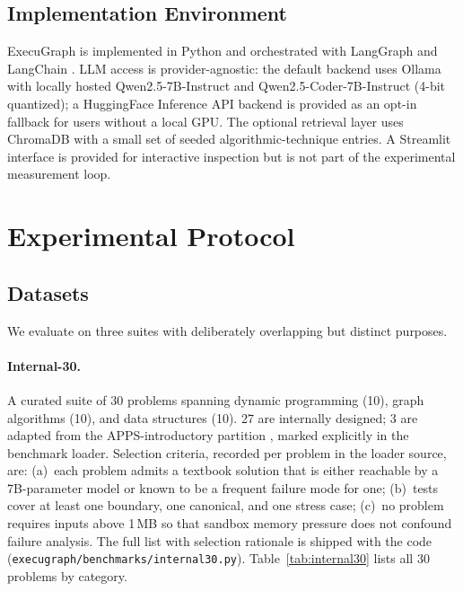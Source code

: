 \documentclass[journal]{IEEEtran}
\begin{document}
\subsection{Implementation Environment}\label{sec:impl}
ExecuGraph is implemented in Python and orchestrated with LangGraph \cite{langgraph} and LangChain \cite{langchain}. LLM access is provider-agnostic: the default backend uses Ollama \cite{ollama} with locally hosted Qwen2.5-7B-Instruct and Qwen2.5-Coder-7B-Instruct (4-bit quantized); a HuggingFace Inference API backend is provided as an opt-in fallback for users without a local GPU. The optional retrieval layer uses ChromaDB \cite{chroma} with a small set of seeded algorithmic-technique entries. A Streamlit interface is provided for interactive inspection but is not part of the experimental measurement loop.


\section{Experimental Protocol}\label{sec:experiments}

\subsection{Datasets}\label{sec:datasets}
We evaluate on three suites with deliberately overlapping but distinct purposes.

\paragraph{Internal-30.}
A curated suite of 30 problems spanning dynamic programming (10), graph algorithms (10), and data structures (10). 27 are internally designed; 3 are adapted from the APPS-introductory partition \cite{hendrycks2021apps}, marked explicitly in the benchmark loader. Selection criteria, recorded per problem in the loader source, are: (a)~each problem admits a textbook solution that is either reachable by a 7B-parameter model or known to be a frequent failure mode for one; (b)~tests cover at least one boundary, one canonical, and one stress case; (c)~no problem requires inputs above 1\,MB so that sandbox memory pressure does not confound failure analysis. The full list with selection rationale is shipped with the code (\texttt{execugraph/benchmarks/internal30.py}). Table~\ref{tab:internal30} lists all 30 problems by category.
\end{document}

